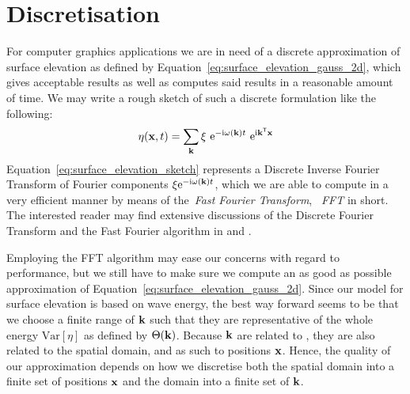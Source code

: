 \section{Discretisation}
\label{sec:random_sea_discretisation}
For computer graphics applications we are in need of a discrete approximation 
of surface elevation as defined by 
Equation~\ref{eq:surface_elevation_gauss_2d}, 
which gives acceptable results as well as computes said results in a reasonable 
amount of time. We may write a rough sketch of such a discrete formulation like 
the following:
\begin{equation}
\label{eq:surface_elevation_sketch}
 \eta(\mathbf{x}, t) = \sum_{\mathbf{k}} 
\xi~\mathrm{e}^{-\mathrm{i}\omega(\mathbf{k}) t}
~\mathrm{e}^{\mathrm{i}\mathbf{k}^{\mathsf{T}}\mathbf{x}}
\end{equation}
Equation~\ref{eq:surface_elevation_sketch} represents a Discrete Inverse 
Fourier Transform of Fourier components 
$\xi\mathrm{e}^{-\mathrm{i}\omega(\mathbf{k}) t}$, which we are able to compute in 
a very efficient manner by means of the~\emph{Fast Fourier Transform}, 
~\emph{FFT} in short. The interested reader may find extensive discussions of 
the Discrete Fourier Transform and the Fast Fourier algorithm
in \cite{book:bracewell2000fourier} and \cite{book:numericalrecipes}.

Employing the FFT algorithm may ease our concerns with regard to performance, but 
we still have to make sure we compute an as good as possible approximation of 
Equation~\ref{eq:surface_elevation_gauss_2d}. Since our model for surface 
elevation is based on wave energy, the best way forward seems to be that we 
choose a finite range of \wavevectors $\mathbf{k}$ such that they are 
representative of the whole energy $\mathrm{Var}[\eta]$ as defined by $\Theta(\mathbf{k})$. 
Because \wavevectors $\mathbf{k}$ are related to \wavelength, they are also 
related to the spatial domain, and as such to positions $\mathbf{x}$. Hence, the 
quality of our approximation depends on how we discretise both the spatial 
domain into a finite set of positions $\mathbf{x}$ and the \wavevector domain 
into a finite set of \wavevectors $\mathbf{k}$.
%
